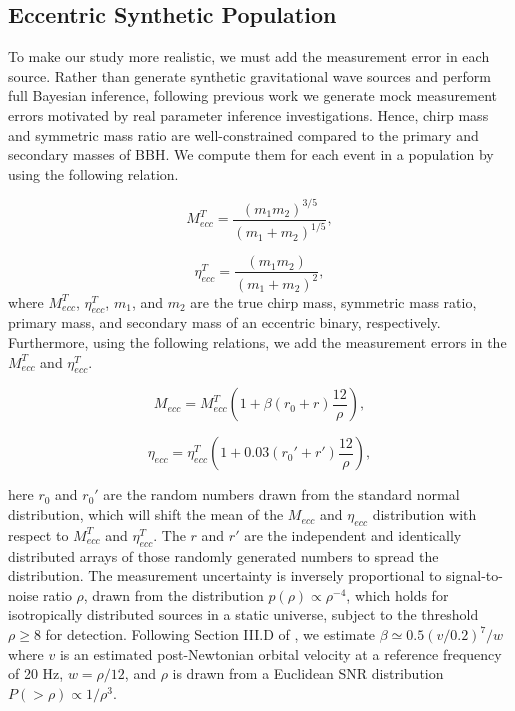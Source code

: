 \documentclass[twocolumn,prd,nofootinbib]{revtex4}
\newcommand\AddedResponse[1]{{\color{blue} {#1}}}
\begin{document}
\subsection{Eccentric Synthetic Population}
\label{subsec:ebbh}
To make our study more realistic, we must add the measurement error in each source.  Rather than generate 
synthetic gravitational wave sources and perform full Bayesian inference, following previous work 
\cite{2017MNRAS.465.3254M} we generate mock measurement errors motivated by real parameter inference 
investigations. Hence, chirp mass and symmetric mass ratio are well-constrained compared to the primary and 
secondary masses of BBH. We compute them for each event in a population by using the following relation.

\AddedResponse{
\begin{equation}
    M_{ecc}^T = \frac{(m_1 m_2)^{3/5}}{(m_1+m_2)^{1/5}},
\end{equation}

\begin{equation}
    \eta_{ecc}^T = \frac{(m_1 m_2)}{(m_1+m_2)^2},
\end{equation}
%
where $M^T_{ecc}$, $\eta^T_{ecc}$, $m_1$, and $m_2$ are the true chirp mass, symmetric mass ratio, primary mass, and secondary mass of an eccentric binary, respectively.
Furthermore, using the following relations, we add the measurement errors in the $M_{ecc}^T$ and $\eta_{ecc}^T$.

\begin{equation}
    M_{ecc} = M_{ecc}^T\left( 1+\beta (r_0+r ) \frac{12}{\rho}\right),
\end{equation}

\begin{equation}
\eta_{ecc} = \eta_{ecc}^T\left( 1+0.03 (r_0'+r') \frac{12}{\rho}\right),   
\end{equation}
}

here $r_0$ and $r_0'$ are the random numbers drawn from the standard normal distribution, which will shift 
the mean of the $M_{ecc}$ and $\eta_{ecc}$ distribution with respect to $M_{ecc}^T$ and $\eta_{ecc}^T$. The $r$ and $r'$ are the 
independent and identically distributed arrays of those randomly generated numbers to spread the distribution. 
The measurement uncertainty is inversely proportional to signal-to-noise ratio $\rho$, drawn from the 
distribution $p(\rho) \propto \rho^{-4}$, which holds for isotropically distributed sources in a static 
universe, subject to the threshold $\rho\geq 8$ for detection.   Following Section III.D of \cite{2022arXiv221007912W}, 
we estimate $\beta \simeq 0.5(v/0.2)^7/w$ where $v$ is an estimated post-Newtonian orbital velocity at a reference frequency of 20
Hz,  $w=\rho/12$, and  $\rho$ is drawn from a Euclidean SNR distribution $P(>\rho)\propto 1/\rho^3$.
\end{document}
